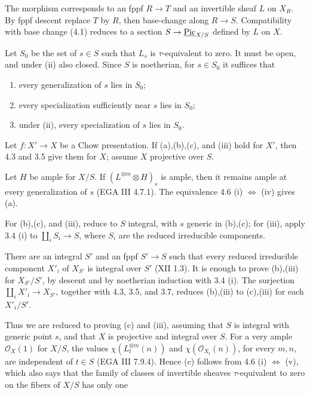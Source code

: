 The morphism corresponds to an fppf \(R\to T\) and an invertible sheaf
\(L\) on \(X_R\). By fppf descent replace \(T\) by \(R\), then base-change
along \(R\to S\). Compatibility with base change (4.1) reduces to a
section \(S\to\underline{\operatorname{Pic}}_{X/S}\) defined by \(L\) on \(X\).

Let \(S_0\) be the set of \(s\in S\) such that \(L_s\) is
\(\tau\)-equivalent to zero. It must be open, and under (ii) also closed.
Since \(S\) is noetherian, for \(s\in S_0\) it suffices that
\begin{enumerate}[label=(\alph*)]
\item every generalization of \(s\) lies in \(S_0\);
\item every specialization sufficiently near \(s\) lies in \(S_0\);
\item under (ii), every specialization of \(s\) lies in \(S_0\).
\end{enumerate}

Let \(f:X'\to X\) be a Chow presentation. If (a),(b),(c), and (iii) hold
for \(X'\), then 4.3 and 3.5 give them for \(X\); assume \(X\) projective
over \(S\).

Let \(H\) be ample for \(X/S\). If
\((L^{\otimes m}\otimes H)_s\) is ample, then it remains ample at every
generalization of \(s\) (EGA III 4.7.1). The equivalence 4.6
(i) \(\Longleftrightarrow\) (iv) gives (a).

For (b),(c), and (iii), reduce to \(S\) integral, with \(s\) generic in
(b),(c); for (iii), apply 3.4 (i) to
\(\coprod_iS_i\to S\), where \(S_i\) are the reduced irreducible
components.

There are an integral \(S'\) and an fppf \(S'\to S\) such that every
reduced irreducible component \(X'_i\) of \(X_{S'}\) is integral over
\(S'\) (XII 1.3). It is enough to prove (b),(iii) for \(X_{S'}/S'\), by
descent and by noetherian induction with 3.4 (i). The surjection
\(\coprod_iX'_i\to X_{S'}\), together with 4.3, 3.5, and 3.7, reduces
(b),(iii) to (c),(iii) for each \(X'_i/S'\).

Thus we are reduced to proving (c) and (iii), assuming that \(S\) is
integral with generic point \(s\), and that \(X\) is projective and
integral over \(S\). For a very ample \(\mathcal O_X(1)\) for \(X/S\),
the values \(\chi(L_t^{\otimes m}(n))\) and
\(\chi(\mathcal O_{X_t}(n))\), for every \(m,n\), are independent of
\(t\in S\) (EGA III 7.9.4). Hence (c) follows from 4.6
(i) \(\Longleftrightarrow\) (v), which also says that the family of
classes of invertible sheaves \(\tau\)-equivalent to zero on the fibers
of \(X/S\) has only one

